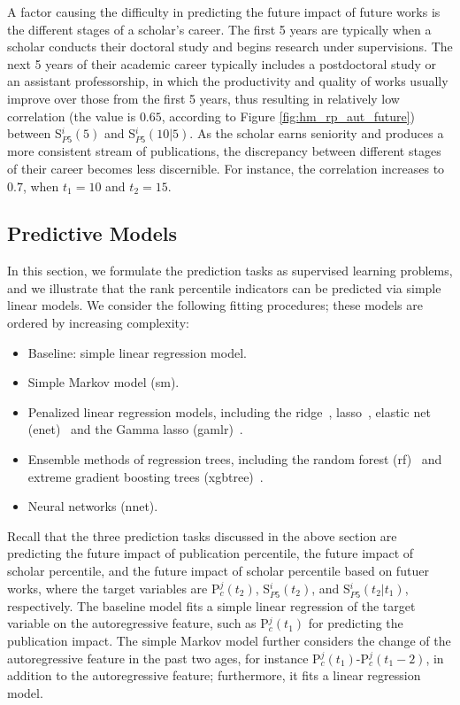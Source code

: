 A factor causing the difficulty in predicting the future impact of future works is the different stages of a scholar's career. The first 5 years are typically when a scholar conducts their doctoral study and begins research under supervisions. The next 5 years of their academic career typically includes a postdoctoral study or an assistant professorship, in which the productivity and quality of works usually improve over those from the first 5 years, thus resulting in relatively low correlation (the value is $0.65$, according to Figure \ref{fig:hm_rp_aut_future}) between S$_{P5}^{i}(5)$ and S$_{P5}^{i}(10|5)$. As the scholar earns seniority and produces a more consistent stream of publications, the discrepancy between different stages of their career becomes less discernible. For instance, the correlation increases to $0.7$, when $t_1=10$ and $t_2=15$. 

\subsection*{Predictive Models}

In this section, we formulate the prediction tasks as supervised learning problems, and we illustrate that the rank percentile indicators can be predicted via simple linear models. We consider the following fitting procedures; these models are ordered by increasing complexity:
\begin{itemize}
    \item Baseline: simple linear regression model.
    \item Simple Markov model (sm).
    \item Penalized linear regression models, including the ridge~\cite{hoerl1970ridge}, lasso~\cite{Tibshirani1996}, elastic net (enet)~\cite{zou2005regularization} and the Gamma lasso (gamlr)~\cite{Taddy2017}.
    \item Ensemble methods of regression trees, including the random forest (rf)~\cite{liaw2002classification} and extreme gradient boosting trees (xgbtree)~\cite{chen2016xgboost}.
    \item Neural networks (nnet).
\end{itemize}

Recall that the three prediction tasks discussed in the above section are predicting the future impact of publication percentile, the future impact of scholar percentile, and the future impact of scholar percentile based on futuer works, where the target variables are P$_c^j(t_2)$, S$_{P5}^i(t_2)$, and S$_{P5}^i(t_2|t_1)$, respectively. The baseline model fits a simple linear regression of the target variable on the autoregressive feature, such as P$_c^{j}(t_1)$ for predicting the publication impact. The simple Markov model further considers the change of the autoregressive feature in the past two ages, for instance P$_c^{j}(t_1)$-P$_c^{j}(t_1-2)$, in addition to the autoregressive feature; furthermore, it fits a linear regression model. 

